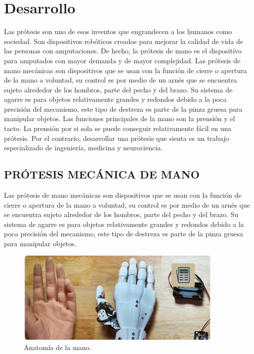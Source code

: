 \documentclass{article}
\begin{document}
\section{Desarrollo}
Las prótesis son uno de esos inventos que engrandecen a los humanos como sociedad. Son dispositivos robóticos creados para mejorar la calidad de vida de las personas con amputaciones. De hecho, la prótesis de mano es el dispositivo para amputados con mayor demanda y de mayor complejidad. Las prótesis de mano mecánicas son dispositivos que se usan con la función de cierre o apertura de la mano a voluntad, su control es por medio de un arnés que se encuentra sujeto alrededor de los hombros, parte del pecho y del brazo. Su sistema de agarre es para objetos relativamente grandes y redondos debido a la poca precisión del mecanismo, este tipo de destreza es parte de la pinza gruesa para manipular objetos. Las funciones principales de la mano son la prensión y el tacto. La prensión por si sola se puede conseguir relativamente fácil en una prótesis. Por el contrario, desarrollar una prótesis que sienta es un trabajo especializado de ingeniería, medicina y neurociencia.

\subsection{PRÓTESIS MECÁNICA DE MANO}
Las prótesis de mano mecánicas son dispositivos que se usan con la función de cierre o apertura de la mano a voluntad, su control es por medio de un arnés que se encuentra sujeto alrededor de los hombros, parte del pecho y del brazo. Su sistema de agarre es para objetos relativamente grandes y redondos debido a la poca precisión del mecanismo, este tipo de destreza es parte de la pinza gruesa para manipular objetos.


\begin{figure}[H] %
    \centering
    \includegraphics[width=100mm]{protemano.jpeg} %
    \caption{Anatomía de la mano\cite{SisID}.}
    \label{grafica:dos}
\end{figure}
\end{document}
